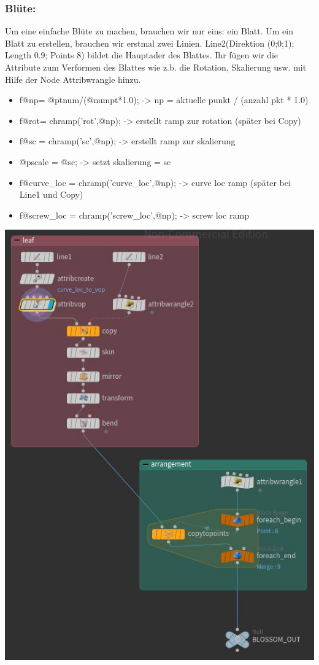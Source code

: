 \documentclass[paper=a4,fontsize=12pt,ngerman]{scrartcl}
\begin{document}
	\subsubsection*{Blüte:}

	Um eine einfache Blüte zu machen, brauchen wir nur eins: ein Blatt. Um ein Blatt zu erstellen, brauchen wir erstmal zwei Linien. Line2(Direktion (0;0;1); Length 0.9; Points 8) bildet die Hauptader des Blattes. Ihr fügen wir die Attribute zum Verformen des Blattes wie z.b. die Rotation, Skalierung usw. mit Hilfe der Node Attribwrangle hinzu.
	\begin{itemize}
		\item f@np= @ptnum/(@numpt*1.0);     	 	-> np = aktuelle punkt / (anzahl pkt * 1.0)
		\item f@rot= chramp('rot',@np); 			-> erstellt ramp zur rotation (später bei Copy)
		\item f@sc = chramp('sc',@np);				-> erstellt ramp zur skalierung
		\item @pscale = @sc;					-> setzt skalierung = sc
		\item f@curve\_loc = chramp('curve\_loc',@np); 	-> curve loc ramp  (später bei Line1 und Copy)
		\item f@screw\_loc = chramp('screw\_loc',@np);	-> screw loc ramp
	\end{itemize}	
	\includegraphics*[scale=0.55]{graphics/blossom.JPG}
\end{document}
